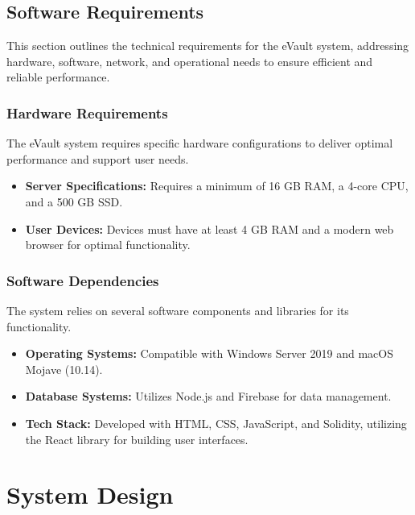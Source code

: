 \documentclass[12pt,a4paper]{report}
\begin{document}
   \section{Software Requirements}

This section outlines the technical requirements for the eVault system, addressing hardware, software, network, and operational needs to ensure efficient and reliable performance.

\subsection{Hardware Requirements}
The eVault system requires specific hardware configurations to deliver optimal performance and support user needs.
\begin{itemize}
    \item \textbf{Server Specifications:} Requires a minimum of 16 GB RAM, a 4-core CPU, and a 500 GB SSD.
    \item \textbf{User Devices:} Devices must have at least 4 GB RAM and a modern web browser for optimal functionality.
\end{itemize}

\subsection{Software Dependencies}
The system relies on several software components and libraries for its functionality.
\begin{itemize}
    \item \textbf{Operating Systems:} Compatible with Windows Server 2019 and macOS Mojave (10.14).
    \item \textbf{Database Systems:} Utilizes Node.js and Firebase for data management.
    \item \textbf{Tech Stack:} Developed with HTML, CSS, JavaScript, and Solidity, utilizing the React library for building user interfaces.
\end{itemize}



\chapter{System Design}
\end{document}
